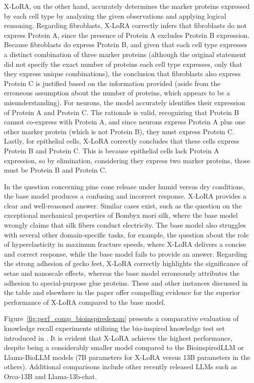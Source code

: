 X-LoRA, on the other hand, accurately determines the marker proteins expressed by each cell type by analyzing the given observations and applying logical reasoning. Regarding fibroblasts, X-LoRA correctly infers that fibroblasts do not express Protein A, since the presence of Protein A excludes Protein B expression. Because fibroblasts do express Protein B, and given that each cell type expresses a distinct combination of three marker proteins (although the original statement did not specify the exact number of proteins each cell type expresses, only that they express unique combinations), the conclusion that fibroblasts also express Protein C is justified based on the information provided (aside from the erroneous assumption about the number of proteins, which appears to be a misunderstanding). For neurons, the model accurately identifies their expression of Protein A and Protein C. The rationale is valid, recognizing that Protein B cannot co-express with Protein A, and since neurons express Protein A plus one other marker protein (which is not Protein B), they must express Protein C. Lastly, for epithelial cells, X-LoRA correctly concludes that these cells express Protein B and Protein C. This is because epithelial cells lack Protein A expression, so by elimination, considering they express two marker proteins, those must be Protein B and Protein C.

In the question concerning pine cone release under humid versus dry conditions, the base model produces a confusing and incorrect response. X-LoRA provides a clear and well-reasoned answer. Similar cases exist, such as the question on the exceptional mechanical properties of Bombyx mori silk, where the base model wrongly claims that silk fibers conduct electricity. The base model also struggles with several other domain-specific tasks, for example, the question about the role of hyperelasticity in maximum fracture speeds, where X-LoRA delivers a concise and correct response, while the base model fails to provide an answer. Regarding the strong adhesion of gecko feet, X-LoRA correctly highlights the significance of setae and nanoscale effects, whereas the base model erroneously attributes the adhesion to special-purpose glue proteins. These and other instances discussed in the table and elsewhere in the paper offer compelling evidence for the superior performance of X-LoRA compared to the base model.

Figure~\ref{fig:perf_comp_bioinspiredexam} presents a comparative evaluation of knowledge recall experiments utilizing the bio-inspired knowledge test set introduced in \cite{Luu2023BioinspiredLLM:Materials}. It is evident that X-LoRA achieves the highest performance, despite being a considerably smaller model compared to the BioinspiredLLM or Llama-BioLLM models (7B parameters for X-LoRA versus 13B parameters in the others). Additional comparisons include other recently released LLMs such as Orca-13B and Llama-13b-chat.

